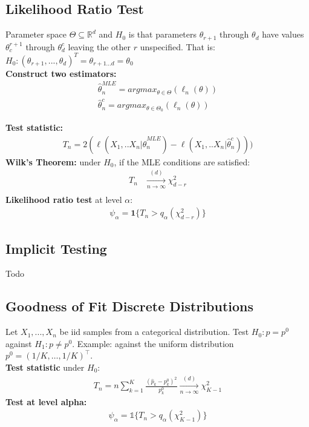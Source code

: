 \subsection{Likelihood Ratio Test}
Parameter space $\Theta \subseteq \mathbb{R}^d$ and $H_0$ is that parameters $\theta_{r+1}$ through $\theta_d$ have values $\theta_c^{r+1}$ through $\theta^c_d$ leaving the other $r$ unspecified. That is:\\
$H_0: (\theta_{r+1}, ..., \theta_d)^T = \theta_{r+1...d} = \theta_0$\\

\textbf{Construct two estimators:}
\begin{align*}
\widehat{\theta}_n^{MLE} = argmax_{\theta \in \Theta}(\ell_n(\theta))\\
\widehat{\theta}_n^c = argmax_{\theta \in \Theta_0}(\ell_n(\theta))
\end{align*}

\textbf{Test statistic:}
\begin{align*}
T_n = 2 ( \ell(X_1,..X_n|\widehat{\theta}_n^{MLE}) - \ell(X_1,..X_n|\widehat{\theta}_n^c)))
\end{align*}
\textbf{Wilk's Theorem:} under $H_0$, if the MLE conditions are satisfied: 
\begin{align*}
T_n& \xrightarrow[n \rightarrow \infty]{(d)} \chi_{d-r}^2\\
\end{align*}
\textbf{Likelihood ratio test} at level $\alpha$:
\begin{align*}
\psi_\alpha = \textbf{1}\{T_n > q_\alpha(\chi^2_{d-r})\}
\end{align*}
\subsection{Implicit Testing}
Todo
\subsection{Goodness of Fit Discrete Distributions}

Let $X_1,...,X_n$ be iid samples from a categorical distribution. Test $H_0: p = p^0$ against $H_1: p \neq p^0$. Example: against the uniform distribution $p^0 = (1/K, \ldots, 1/K)^\top$.\\

\textbf{Test statistic} under $H_0$:
\begin{align*}
T_n = n\sum_{k=1}^K\frac{(\hat{p}_k - p^0_k)^2}{p^0_k} \xrightarrow[n \rightarrow \infty]{(d)} \chi^2_{K-1}
\end{align*}
\textbf{Test at level alpha:}
\begin{align*}
\psi_\alpha = \mathbb{1}\{T_n > q_\alpha(\chi^2_{K-1})\}
\end{align*}

